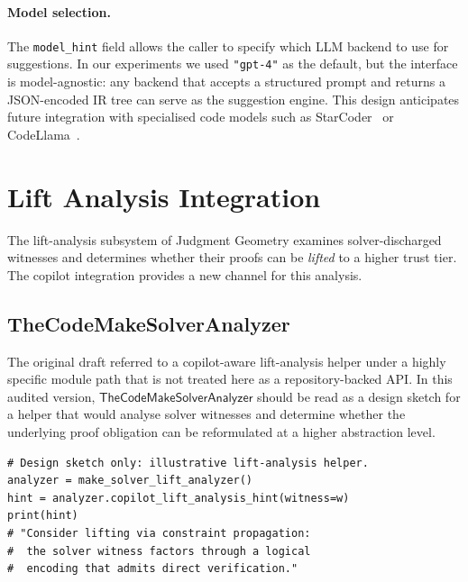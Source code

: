 \documentclass[11pt]{article}
\newcommand{\TCA}{\mathsf{TheCodeMakeSolverAnalyzer}}
\begin{document}
\paragraph{Model selection.}
The \texttt{model\_hint} field allows the caller to specify which LLM
backend to use for suggestions.  In our experiments we used
\texttt{"gpt-4"} as the default, but the interface is model-agnostic:
any backend that accepts a structured prompt and returns a JSON-encoded
IR tree can serve as the suggestion engine.  This design anticipates
future integration with specialised code models such as
StarCoder~\cite{li2023starcoder} or CodeLlama~\cite{roziere2023codellama}.

\section{Lift Analysis Integration}\label{sec:lift}

The lift-analysis subsystem of Judgment Geometry examines
solver-discharged witnesses and determines whether their proofs can be
\emph{lifted} to a higher trust tier.  The copilot integration
provides a new channel for this analysis.

\subsection{TheCodeMakeSolverAnalyzer}\label{sec:tca}

The original draft referred to a copilot-aware lift-analysis helper
under a highly specific module path that is not treated here as a
repository-backed API.  In this audited version, $\TCA$ should be read
as a design sketch for a helper that would analyse solver witnesses and determine whether
the underlying proof obligation can be reformulated at a higher
abstraction level.

\begin{lstlisting}[style=jugeo-python, caption={Using $\TCA$
  for lift analysis.}]
# Design sketch only: illustrative lift-analysis helper.
analyzer = make_solver_lift_analyzer()
hint = analyzer.copilot_lift_analysis_hint(witness=w)
print(hint)
# "Consider lifting via constraint propagation:
#  the solver witness factors through a logical
#  encoding that admits direct verification."
\end{lstlisting}
\end{document}
